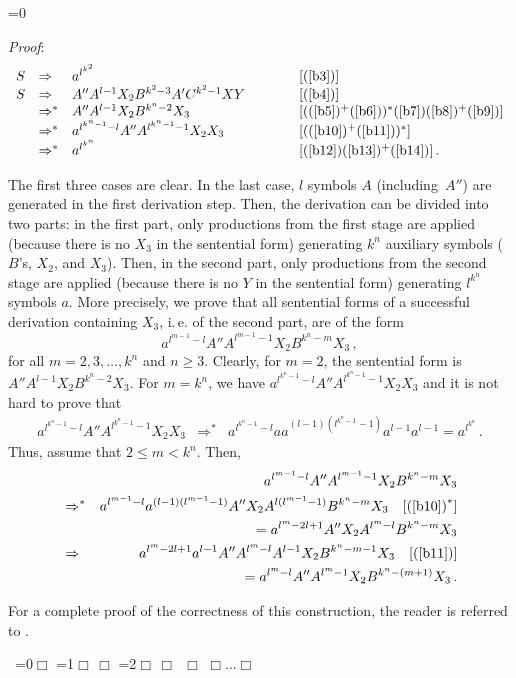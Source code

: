 \documentclass[copyright]{eptcs}
\makeatletter
\newcounter{d@proof}\let\thed@proof\relax\setcounter{d@proof}{0}
\newcommand*{\qed}{$\Box$}
\newenvironment{proof}{\ifnum \value{d@proof}=0{\setcounter{claim}{0}}\else\fi
  \stepcounter{d@proof}\par\noindent
  {\rmfamily\itshape\mdseries Proof\/}:\hspace{\labelsep}\ignorespaces}{\addtocounter{d@proof}{-1}\mbox{}\nolinebreak\hfill~\ifnum \value{d@proof}=0{\qed}\else
    \ifnum \value{d@proof}=1{\qed\nolinebreak\,\nolinebreak\qed}\else
      \ifnum \value{d@proof}=2{\qed\nolinebreak\,\nolinebreak\qed
          \nolinebreak\,\nolinebreak\qed}\else
        {\qed\nolinebreak...\nolinebreak\qed}\fi\fi\fi
  \medbreak
}
\newcommand{\Ra}{\Rightarrow}
\makeatother
\begin{document}
\begin{proof}
\[\begin{array}{rllcl}
      S & \Ra   & a^{l^{k^2}}                             & \qquad & [\textrm{(\ref{b3})}]\\
      S & \Ra   & A''A^{l-1}X_2B^{k^2-3}A'C^{k^2-1}XY     & & [\textrm{(\ref{b4})}]\\
        & \Ra^* & A''A^{l-1}X_2B^{k^n-2}X_3               & & [\textrm{((\ref{b5})$^+$(\ref{b6}))$^*$(\ref{b7})(\ref{b8})$^+$(\ref{b9})}]\\
        & \Ra^* & a^{l^{k^n-1}-l}A''A^{l^{k^n-1}-1}X_2X_3 & & [\textrm{((\ref{b10})$^+$(\ref{b11}))$^*$}]\\
        & \Ra^* & a^{l^{k^n}}                             & & [\textrm{(\ref{b12})(\ref{b13})$^+$(\ref{b14})}]\,.
    \end{array}\]

    The first three cases are clear. In the last case, $l$ symbols $A$ (including~$A''$) are generated in the first derivation step. Then, the derivation can be divided into two parts: in the first part, only productions from the first stage are applied (because there is no $X_3$ in the sentential form) generating $k^n$ auxiliary symbols ($B$'s, $X_2$, and $X_3$). Then, in the second part, only productions from the second stage are applied (because there is no $Y$ in the sentential form) generating $l^{k^n}$ symbols $a$. More precisely, we prove that all sentential forms of a successful derivation containing $X_3$, i.\,e. of the second part, are of the form \[a^{l^{m-1}-l}A''A^{l^{m-1}-1}X_2B^{k^n-m}X_3\,,\] for all $m=2,3,\dots,k^n$ and $n\ge 3$. Clearly, for $m=2$, the sentential form is $A''A^{l-1}X_2B^{k^n-2}X_3$. For $m=k^n$, we have $a^{l^{k^n-1}-l}A''A^{l^{k^n-1}-1}X_2X_3$ and it is not hard to prove that
    \begin{eqnarray*}
      a^{l^{k^n-1}-l}A''A^{l^{k^n-1}-1}X_2X_3 & \Ra^* & a^{l^{k^n-1}-l}aa^{(l-1)(l^{k^n-1}-1)}a^{l-1}a^{l-1} = a^{l^{k^n}}\,.
    \end{eqnarray*} Thus, assume that $2\le m < k^n$. Then,
    \begin{eqnarray*}
      &       & a^{l^{m-1}-l}A''A^{l^{m-1}-1}X_2B^{k^n-m}X_3\\
      & \Ra^* & a^{l^{m-1}-l}a^{(l-1)(l^{m-1}-1)}A''X_2A^{l(l^{m-1}-1)}B^{k^n-m}X_3\quad [\textrm{(\ref{b10})}^*]\\
      &&=      a^{l^m-2l+1}A''X_2A^{l^m-l}B^{k^n-m}X_3\\
      & \Ra   & a^{l^m-2l+1}a^{l-1}A''A^{l^m-l}A^{l-1}X_2B^{k^n-m-1}X_3\quad [\textrm{(\ref{b11})}]\\
      &&=     a^{l^m-l}A''A^{l^m-1}X_2B^{k^n-(m+1)}X_3\,.
    \end{eqnarray*}

    For a complete proof of the correctness of this construction, the reader is referred to \cite{masopust:mono}.
  \end{proof}
\end{document}
